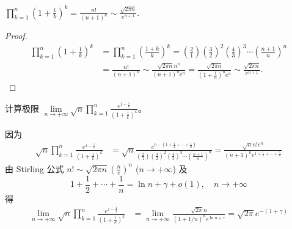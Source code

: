 \documentclass[../../main.tex]{subfiles}
\begin{document}
\begin{proposition}
$\prod_{k=1}^n{\left( 1+\frac{1}{k} \right) ^k}=\frac{n!}{\left( n+1 \right) ^n}\sim \frac{\sqrt{2\pi n}}{e^{n+1}}.$
\end{proposition}
\begin{proof}
\begin{align*}
\prod_{k=1}^n{\left( 1+\frac{1}{k} \right) ^k}&=\prod_{k=1}^n{\left( \frac{1+k}{k} \right) ^k}=\left( \frac{2}{1} \right) \left( \frac{3}{2} \right) ^2\left( \frac{4}{3} \right) ^3\cdots \left( \frac{n+1}{n} \right) ^n
\\
&=\frac{n!}{\left( n+1 \right) ^n}\sim \frac{\sqrt{2\pi n}n^n}{\left( n+1 \right) ^ne^n}=\frac{\sqrt{2\pi n}}{\left( 1+\frac{1}{n} \right) ^ne^n}\sim \frac{\sqrt{2\pi n}}{e^{n+1}}.
\end{align*}
\end{proof}

\begin{example}
计算极限 $\lim\limits_{n \to +\infty} \sqrt{n} \prod_{k = 1}^{n} \frac{e^{1 - \frac{1}{k}}}{(1 + \frac{1}{k})^k}$。
\end{example}
\begin{solution}
因为
\begin{align*}
\sqrt{n} \prod_{k = 1}^{n} \frac{e^{1 - \frac{1}{k}}}{(1 + \frac{1}{k})^k} &= \sqrt{n} \frac{e^{n - (1 + \frac{1}{2} + \cdots + \frac{1}{n})}}{(\frac{2}{1})(\frac{3}{2})^2 (\frac{4}{3})^3 \cdots (\frac{n + 1}{n})^n} = \frac{\sqrt{n}n!e^n}{(n + 1)^n e^{1 + \frac{1}{2} + \cdots + \frac{1}{n}}}
\end{align*}
由 Stirling 公式 $n! \sim \sqrt{2\pi n} (\frac{n}{e})^n$ ($n \to +\infty$) 及
\[1 + \frac{1}{2} + \cdots + \frac{1}{n} = \ln n + \gamma + o(1),\quad n \to +\infty\]
得
\begin{align*}
\lim_{n \to +\infty} \sqrt{n} \prod_{k = 1}^{n} \frac{e^{1 - \frac{1}{k}}}{(1 + \frac{1}{k})^k} &= \lim_{n \to +\infty} \frac{\sqrt{2\pi}n}{(1 + 1/n)^n e^{\ln n + \gamma}} = \sqrt{2\pi} e^{-(1 + \gamma)}
\end{align*} 
\end{solution}
\end{document}

